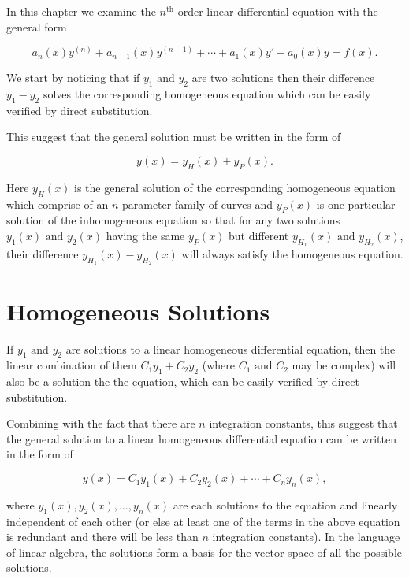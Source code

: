 \documentclass[english,a4paper,12pt]{report}
\begin{document}
In this chapter we examine the \(n^{\text{th}} \) order linear differential equation with the general form

\begin{equation}
    a_{n}(x) y^{(n)} + a_{n-1}(x)y^{(n-1)} + \cdots + a_1 (x)y' + a_0 (x)y = f(x).    
\end{equation}

We start by noticing that if \(y_1 \text { and } y_2 \) are two solutions then their difference \(y_1 -y_2 \) solves the corresponding homogeneous equation which can be easily verified by direct substitution.

This suggest that the general solution must be written in the form of

\begin{equation}
    y(x) = y_{H}(x) + y_{P}(x).  
\end{equation}

Here \(y_{H}(x) \) is the general solution of the corresponding homogeneous equation which comprise of an \(n\)-parameter family of curves and \(y_{P}(x) \) is one particular solution of the inhomogeneous equation so that for any two solutions \(y_1 (x) \text { and } y_2 (x)\) having the same \(y_{P}(x) \) but different \(y_{H_1 }(x) \text { and } y_{H_2 }(x)  \), their difference \(y_{H_1 }(x) - y_{H_2 }(x)\) will always satisfy the homogeneous equation.     

\section{Homogeneous Solutions}

If \(y_1 \text { and } y_2  \) are solutions to a linear homogeneous differential equation, then the linear combination of them \(C_1 y_1 + C_2 y_2 \) (where \(C_1 \text { and } C_2\) may be complex) will also be a solution the the equation, which can be easily verified by direct substitution. 

Combining with the fact that there are \(n\) integration constants, this suggest that the general solution to a linear homogeneous differential equation can be written in the form of 

\begin{equation}
    y(x) = C_1 y_1 (x) + C_2 y_2 (x) + \cdots + C_{n}y_{n}(x),  
\end{equation}

where \(y_1 (x), y_2 (x), \ldots , y_{n}(x) \) are each solutions to the equation and linearly independent of each other (or else at least one of the terms in the above equation is redundant and there will be less than \(n\) integration constants). In the language of linear algebra, the solutions form a basis for the vector space of all the possible solutions.
\end{document}
